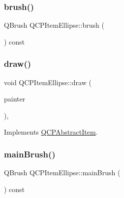 \mbox{\label{class_q_c_p_item_ellipse_aacf45d032f204d0df3dd0bfdf1172cd3}} 
\subsubsection{\texorpdfstring{brush()}{brush()}}
{\footnotesize\ttfamily Q\+Brush Q\+C\+P\+Item\+Ellipse\+::brush (\begin{DoxyParamCaption}{ }\end{DoxyParamCaption}) const\hspace{0.3cm}{\ttfamily [inline]}}

\mbox{\label{class_q_c_p_item_ellipse_a77eebd67a402fc496082a2e51356928c}} 
\subsubsection{\texorpdfstring{draw()}{draw()}}
{\footnotesize\ttfamily void Q\+C\+P\+Item\+Ellipse\+::draw (\begin{DoxyParamCaption}\item[{\mbox{\hyperlink{class_q_c_p_painter}{Q\+C\+P\+Painter}} $\ast$}]{painter }\end{DoxyParamCaption})\hspace{0.3cm}{\ttfamily [protected]}, {\ttfamily [virtual]}}



Implements \mbox{\hyperlink{class_q_c_p_abstract_item_a007fdab79c935a5da5aa04a21d268c18}{Q\+C\+P\+Abstract\+Item}}.

\mbox{\label{class_q_c_p_item_ellipse_a6218bdf5e703f609b934b0bf9c8d0971}} 
\subsubsection{\texorpdfstring{mainBrush()}{mainBrush()}}
{\footnotesize\ttfamily Q\+Brush Q\+C\+P\+Item\+Ellipse\+::main\+Brush (\begin{DoxyParamCaption}{ }\end{DoxyParamCaption}) const\hspace{0.3cm}{\ttfamily [protected]}}


